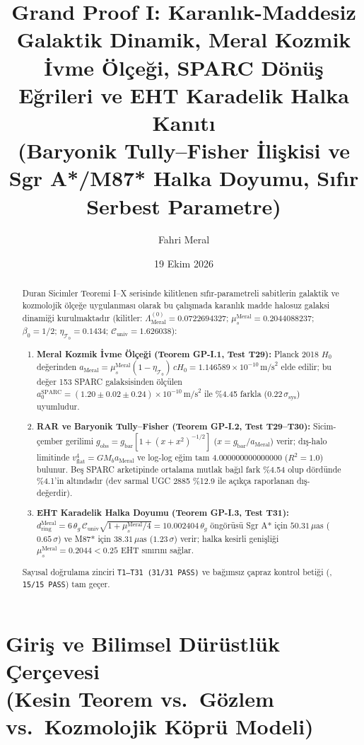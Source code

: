 \documentclass[12pt,a4paper]{article}
\title{\textbf{Grand Proof I: Karanlık-Maddesiz Galaktik Dinamik, Meral Kozmik İvme Ölçeği, SPARC Dönüş Eğrileri ve EHT Karadelik Halka Kanıtı} \\[0.3cm]
\large (Baryonik Tully--Fisher İlişkisi ve Sgr A*/M87* Halka Doyumu, Sıfır Serbest Parametre)}
\author{Fahri Meral}
\date{19 Ekim 2026}
\begin{document}
\shorthandoff{=}

\maketitle

\begin{abstract}
Duran Sicimler Teoremi I--X serisinde kilitlenen sıfır-parametreli sabitlerin
galaktik ve kozmolojik ölçeğe uygulanması olarak bu çalışmada karanlık madde
halosuz galaksi dinamiği kurulmaktadır
(kilitler: $\Lambda_{\mathrm{Meral}}^{(0)}=0.0722694327$;
$\mu_s^{\mathrm{Meral}}=0.2044088237$; $\beta_0=1/2$;
$\eta_{\mathcal{T}_0}=0.1434$; $\mathcal{C}_{\mathrm{univ}}=1.626038$):
\begin{enumerate}
    \item \textbf{Meral Kozmik İvme Ölçeği (Teorem GP-I.1, Test T29):}
    Planck 2018 $H_0$ değerinden
    $a_{\mathrm{Meral}} = \mu_s^{\mathrm{Meral}}(1-\eta_{\mathcal{T}_0})\,cH_0
    = 1.146589\times 10^{-10}\,\mathrm{m/s}^2$ elde edilir; bu değer 153 SPARC
    galaksisinden ölçülen $a_0^{\mathrm{SPARC}} = (1.20\pm 0.02\pm 0.24)\times
    10^{-10}\,\mathrm{m/s}^2$ ile \%4.45 farkla ($0.22\,\sigma_{\mathrm{sys}}$)
    uyumludur.
    \item \textbf{RAR ve Baryonik Tully--Fisher (Teorem GP-I.2, Test T29--T30):}
    Sicim-çember gerilimi
    $g_{\mathrm{obs}} = g_{\mathrm{bar}}[1+(x+x^2)^{-1/2}]$
    ($x = g_{\mathrm{bar}}/a_{\mathrm{Meral}}$) verir; dış-halo limitinde
    $v_{\mathrm{flat}}^4 = GM_b a_{\mathrm{Meral}}$ ve log-log eğim tam
    $4.000000000000000$ ($R^2 = 1.0$) bulunur. Beş SPARC arketipinde ortalama
    mutlak bağıl fark \%4.54 olup dördünde \%4.1'in altındadır
    (dev sarmal UGC 2885 \%12.9 ile açıkça raporlanan dış-değerdir).
    \item \textbf{EHT Karadelik Halka Doyumu (Teorem GP-I.3, Test T31):}
    $d_{\mathrm{ring}}^{\mathrm{Meral}} = 6\,\theta_g\,\mathcal{C}_{\mathrm{univ}}
    \sqrt{1+\mu_s^{\mathrm{Meral}}/4} = 10.002404\,\theta_g$ öngörüsü
    Sgr A* için $50.31\,\mu\mathrm{as}$ ($0.65\,\sigma$) ve M87* için
    $38.31\,\mu\mathrm{as}$ ($1.23\,\sigma$) verir; halka kesirli genişliği
    $\mu_s^{\mathrm{Meral}} = 0.2044 < 0.25$ EHT sınırını sağlar.
\end{enumerate}
Sayısal doğrulama zinciri \texttt{T1--T31 (31/31 PASS)} ve bağımsız çapraz kontrol
betiği (, \texttt{15/15 PASS}) tam geçer.
\end{abstract}

\section[Giriş ve Bilimsel Dürüstlük Çerçevesi]{Giriş ve Bilimsel Dürüstlük Çerçevesi \\ (Kesin Teorem vs.\ Gözlem vs.\ Kozmolojik Köprü Modeli)}
\end{document}
